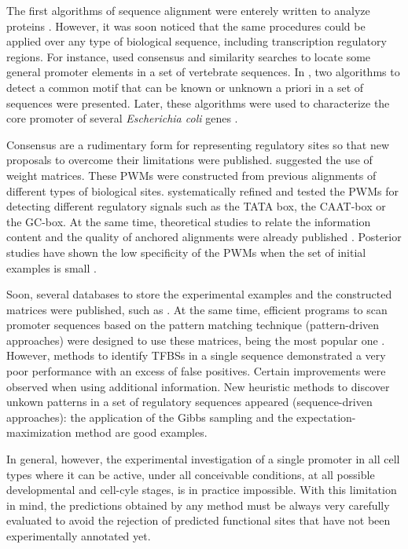 
The first algorithms of sequence alignment were enterely written to analyze proteins \citep{needleman:1970a}.
However, it was soon noticed that the same procedures could be applied over any type of biological
sequence, including transcription regulatory regions. For instance, \citet{sadler:1983a} used consensus 
and similarity searches to locate some general promoter elements in a set of vertebrate sequences. In 
\citep{waterman:1984d}, two algorithms to detect a common motif that can be known or unknown a priori 
in a set of sequences were presented. Later, these algorithms were used to characterize the 
core promoter of several \emph{Escherichia coli} genes \citep{galas:1985a}.

Consensus are a rudimentary form for representing regulatory sites so that new proposals to overcome their
limitations were published. \citet{staden:1984a} suggested the use of weight matrices. These PWMs were 
constructed from previous alignments of different types of biological sites. \citet{bucher:1990a}
systematically refined and tested the PWMs for detecting different regulatory 
signals such as the TATA box, the CAAT-box or the GC-box. At the same time, theoretical studies
to relate the information content and the quality of anchored alignments were already 
published \citep{schneider:1990a}. Posterior studies have shown the low specificity of the PWMs
when the set of initial examples is small \citep{schones:2005a}.

Soon, several databases to store the experimental examples and the constructed matrices were published, 
such as  \citep{wingender:1988a}. At the same time, efficient programs to scan promoter 
sequences based on the pattern matching technique (pattern-driven approaches) were designed to use these 
matrices, being  the most popular one \citep{frech:1993a,quandt:1995a}. However, methods 
to identify TFBSs in a single sequence demonstrated a very poor performance with an excess of false positives.
Certain improvements were observed when using additional information. New heuristic methods to discover 
unkown patterns in a set of regulatory sequences appeared (sequence-driven approaches): the application 
of the Gibbs sampling \citep{lawrence:1993a} and the expectation-maximization method \citep{bailey:1994a} 
are good examples. 

In general, however, the experimental investigation of a single promoter in all cell types where it can 
be active, under all conceivable conditions, at all possible developmental and cell-cyle stages, is 
in practice impossible. With this limitation in mind, the predictions obtained by any method must
be always very carefully evaluated to avoid the rejection of predicted functional sites that have not been 
experimentally annotated yet.

